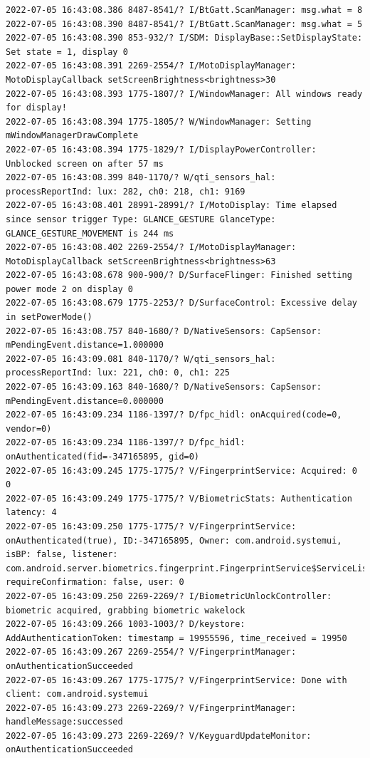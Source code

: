\documentclass[a4paper,12pt]{book}
\begin{document}
\begin{lstlisting}
2022-07-05 16:43:08.386 8487-8541/? I/BtGatt.ScanManager: msg.what = 8
2022-07-05 16:43:08.390 8487-8541/? I/BtGatt.ScanManager: msg.what = 5
2022-07-05 16:43:08.390 853-932/? I/SDM: DisplayBase::SetDisplayState: Set state = 1, display 0
2022-07-05 16:43:08.391 2269-2554/? I/MotoDisplayManager: MotoDisplayCallback setScreenBrightness<brightness>30
2022-07-05 16:43:08.393 1775-1807/? I/WindowManager: All windows ready for display!
2022-07-05 16:43:08.394 1775-1805/? W/WindowManager: Setting mWindowManagerDrawComplete
2022-07-05 16:43:08.394 1775-1829/? I/DisplayPowerController: Unblocked screen on after 57 ms
2022-07-05 16:43:08.399 840-1170/? W/qti_sensors_hal: processReportInd: lux: 282, ch0: 218, ch1: 9169
2022-07-05 16:43:08.401 28991-28991/? I/MotoDisplay: Time elapsed since sensor trigger Type: GLANCE_GESTURE GlanceType: GLANCE_GESTURE_MOVEMENT is 244 ms
2022-07-05 16:43:08.402 2269-2554/? I/MotoDisplayManager: MotoDisplayCallback setScreenBrightness<brightness>63
2022-07-05 16:43:08.678 900-900/? D/SurfaceFlinger: Finished setting power mode 2 on display 0
2022-07-05 16:43:08.679 1775-2253/? D/SurfaceControl: Excessive delay in setPowerMode()
2022-07-05 16:43:08.757 840-1680/? D/NativeSensors: CapSensor:  mPendingEvent.distance=1.000000
2022-07-05 16:43:09.081 840-1170/? W/qti_sensors_hal: processReportInd: lux: 221, ch0: 0, ch1: 225
2022-07-05 16:43:09.163 840-1680/? D/NativeSensors: CapSensor:  mPendingEvent.distance=0.000000
2022-07-05 16:43:09.234 1186-1397/? D/fpc_hidl: onAcquired(code=0, vendor=0)
2022-07-05 16:43:09.234 1186-1397/? D/fpc_hidl: onAuthenticated(fid=-347165895, gid=0)
2022-07-05 16:43:09.245 1775-1775/? V/FingerprintService: Acquired: 0 0
2022-07-05 16:43:09.249 1775-1775/? V/BiometricStats: Authentication latency: 4
2022-07-05 16:43:09.250 1775-1775/? V/FingerprintService: onAuthenticated(true), ID:-347165895, Owner: com.android.systemui, isBP: false, listener: com.android.server.biometrics.fingerprint.FingerprintService$ServiceListenerImpl@73d1dbf, requireConfirmation: false, user: 0
2022-07-05 16:43:09.250 2269-2269/? I/BiometricUnlockController: biometric acquired, grabbing biometric wakelock
2022-07-05 16:43:09.266 1003-1003/? D/keystore: AddAuthenticationToken: timestamp = 19955596, time_received = 19950
2022-07-05 16:43:09.267 2269-2554/? V/FingerprintManager: onAuthenticationSucceeded
2022-07-05 16:43:09.267 1775-1775/? V/FingerprintService: Done with client: com.android.systemui
2022-07-05 16:43:09.273 2269-2269/? V/FingerprintManager: handleMessage:successed
2022-07-05 16:43:09.273 2269-2269/? V/KeyguardUpdateMonitor: onAuthenticationSucceeded

\end{lstlisting}
\end{document}
